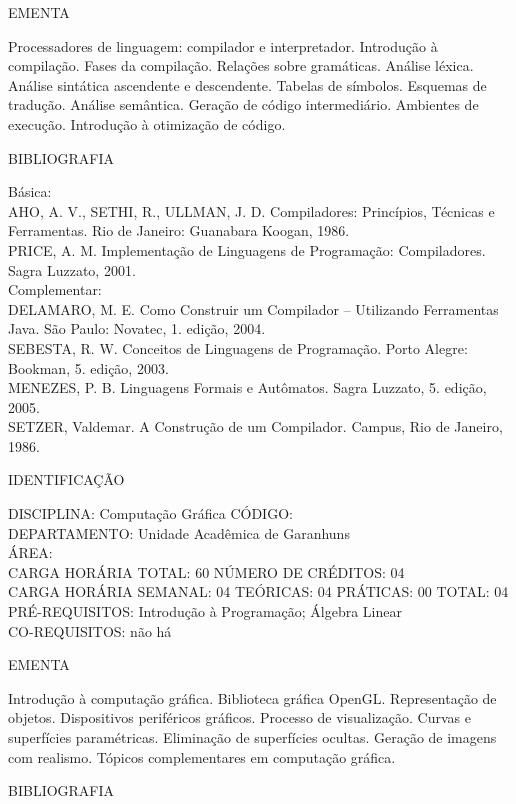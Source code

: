\documentclass[
	12pt,				%
	openright,			%
  oneside,     %
	a4paper,			%
	english,			%
	french,				%
	spanish,			%
	brazil				%
	]{abntex2}
\begin{document}
\begin{apendicesenv}
EMENTA 

Processadores de linguagem: compilador e interpretador. Introdução à
compilação. Fases da compilação. Relações sobre gramáticas. Análise
léxica. Análise sintática ascendente e descendente. Tabelas de
símbolos. Esquemas de tradução. Análise semântica. Geração de código
intermediário. Ambientes de execução. Introdução à otimização de
código.

BIBLIOGRAFIA 

Básica:\\
AHO, A. V., SETHI, R., ULLMAN, J. D. Compiladores: Princípios, Técnicas
e Ferramentas. Rio de Janeiro: Guanabara Koogan, 1986.\\
PRICE, A. M. Implementação de Linguagens de Programação: Compiladores.
Sagra Luzzato, 2001.\\
Complementar:\\
DELAMARO, M. E. Como Construir um Compilador -- Utilizando Ferramentas
Java. São Paulo: Novatec, 1. edição, 2004.\\
SEBESTA, R. W. Conceitos de Linguagens de Programação. Porto Alegre:
Bookman, 5. edição, 2003.\\
MENEZES, P. B. Linguagens Formais e Autômatos. Sagra Luzzato, 5. edição,
2005.\\
SETZER, Valdemar. A Construção de um Compilador. Campus, Rio de Janeiro, 1986.

\newpage IDENTIFICAÇÃO

DISCIPLINA: Computação Gráfica CÓDIGO:\\ 
DEPARTAMENTO: Unidade Acadêmica de Garanhuns\\
ÁREA: \\
CARGA HORÁRIA TOTAL: 60 NÚMERO DE CRÉDITOS: 04\\
CARGA HORÁRIA SEMANAL: 04 TEÓRICAS: 04 PRÁTICAS: 00 TOTAL: 04\\
PRÉ-REQUISITOS: Introdução à Programação; Álgebra Linear\\
CO-REQUISITOS: não há

EMENTA 

Introdução à computação gráfica. Biblioteca gráfica OpenGL.
Representação de objetos. Dispositivos periféricos gráficos. Processo
de visualização. Curvas e superfícies paramétricas. Eliminação de
superfícies ocultas. Geração de imagens com realismo. Tópicos
complementares em computação gráfica.

BIBLIOGRAFIA 


\end{apendicesenv}
\end{document}
